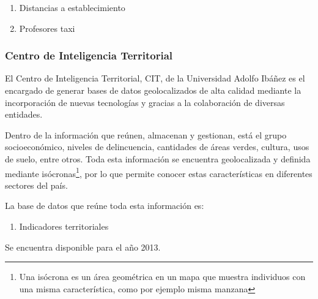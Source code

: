 \begin{enumerate}
\item Distancias a establecimiento
\item Profesores taxi
\end{enumerate}

\subsubsection{Centro de Inteligencia Territorial}
El Centro de Inteligencia Territorial, CIT, de la Universidad Adolfo Ibáñez es el encargado de generar bases de datos geolocalizados de alta calidad mediante la incorporación de nuevas tecnologías y gracias a la colaboración de diversas entidades. 

Dentro de la información que reúnen, almacenan y gestionan, está el grupo socioeconómico, niveles de delincuencia, cantidades de áreas verdes, cultura, usos de suelo, entre otros. Toda esta información se encuentra geolocalizada y definida mediante isócronas\footnote{Una isócrona es un área geométrica en un mapa que muestra individuos con una misma característica, como por ejemplo misma manzana}, por lo que permite conocer estas características en diferentes sectores del país.

La base de datos que reúne toda esta información es:
\begin{enumerate}
\item Indicadores territoriales
\end{enumerate}

Se encuentra disponible para el año 2013. 

